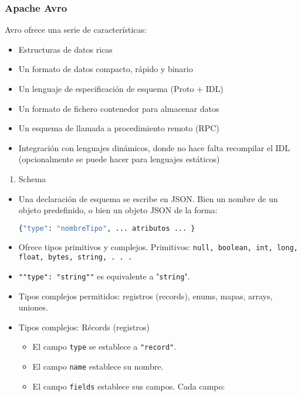 \subsubsection{Apache Avro}
Avro ofrece una serie de características:
\begin{itemize}
	\item Estructuras de datos ricas
	\item Un formato de datos compacto, rápido y binario
	\item Un lenguaje de especificación de esquema (Proto + IDL)
	\item Un formato de fichero contenedor para almacenar datos
	\item Un esquema de llamada a procedimiento remoto (RPC)
	\item Integración con lenguajes dinámicos, donde no hace falta recompilar el IDL (opcionalmente se puede hacer para lenguajes estáticos)
\end{itemize}
\begin{enumerate}[label=\arabic*)]
	\item Schema
\end{enumerate}
\begin{itemize}
	\item Una declaración de esquema se escribe en JSON. Bien un nombre de un objeto predefinido, o bien un objeto JSON de la forma:
	\begin{lstlisting}[language=python]
{"type": "nombreTipo", ... atributos ... }
	\end{lstlisting}
	\item Ofrece tipos primitivos y complejos. Primitivos: \texttt{null, boolean, int, long, float, bytes, string, . . .}
	\item \texttt{"{"type": "string"}"} es equivalente a "\texttt{string}".
	\item Tipos complejos permitidos: registros (records), enums, mapas, arrays, uniones.
	\item Tipos complejos: Récords (registros)
	\begin{itemize}
		\item El campo \texttt{type} se establece a \texttt{"record"}.
		\item El campo \texttt{name} establece su nombre.
		\item El campo \texttt{fields} establece sus campos. Cada campo:
		
	\end{itemize}
\end{itemize}